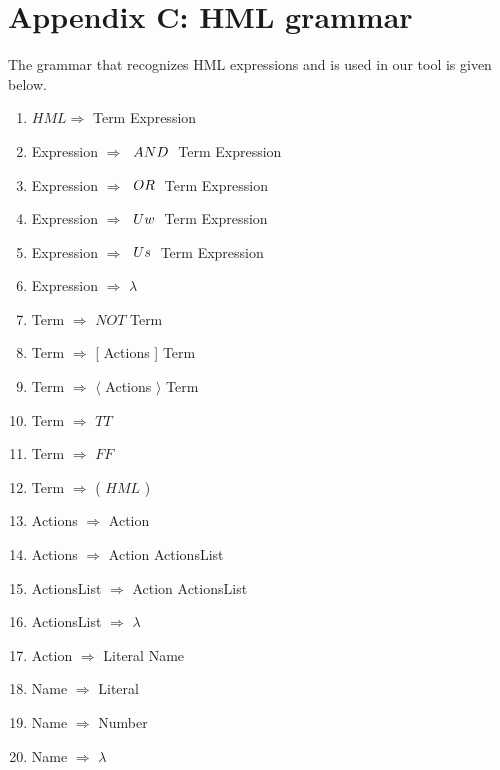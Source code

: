 \section*{Appendix C: HML grammar}

The grammar that recognizes HML expressions and is used in our tool is given below.

\begin{enumerate}
\item $HML \Rightarrow$ Term Expression
\item Expression $\Rightarrow$ $\hspace{1 mm} AND \hspace{1 mm} $ Term Expression
\item Expression $\Rightarrow$ $\hspace{1 mm} OR \hspace{1 mm} $ Term Expression
\item Expression $\Rightarrow$ $\hspace{1 mm} Uw \hspace{1 mm} $ Term Expression
\item Expression $\Rightarrow$ $\hspace{1 mm} Us \hspace{1 mm} $ Term Expression
\item Expression $\Rightarrow$ $\lambda$
\item Term $\Rightarrow$ $NOT$ Term
\item Term $\Rightarrow$ [ Actions ] Term
\item Term $\Rightarrow$ $\langle$ Actions $\rangle$ Term
\item Term $\Rightarrow$ $TT$
\item Term $\Rightarrow$ $FF$
\item Term $\Rightarrow$ ( $HML$ )
\item Actions $\Rightarrow$ Action
\item Actions $\Rightarrow$ { Action ActionsList }
\item ActionsList $\Rightarrow$ Action ActionsList
\item ActionsList $\Rightarrow$ $\lambda$
\item Action $\Rightarrow$ Literal Name
\item Name $\Rightarrow$ Literal
\item Name $\Rightarrow$ Number
\item Name $\Rightarrow$ $\lambda$

\end{enumerate}
